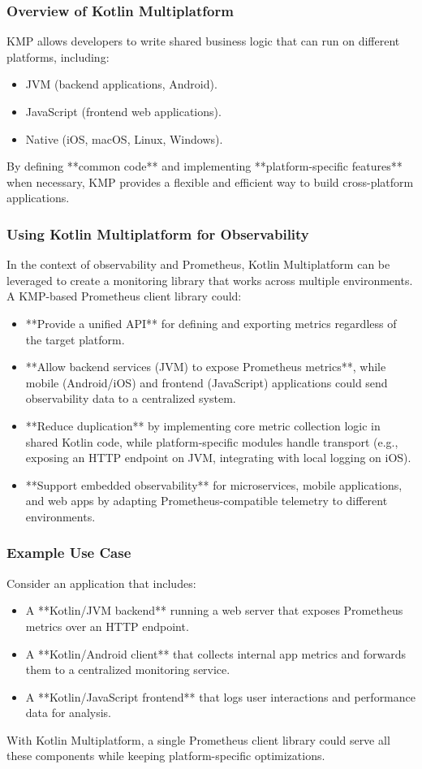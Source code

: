 \documentclass[a4paper,twoside,11pt]{article}
\begin{document}
\subsubsection{Overview of Kotlin Multiplatform}
KMP allows developers to write shared business logic that can run on different platforms, including:
\begin{itemize}
    \item JVM (backend applications, Android).
    \item JavaScript (frontend web applications).
    \item Native (iOS, macOS, Linux, Windows).
\end{itemize}
By defining **common code** and implementing **platform-specific features** when necessary, KMP provides a flexible and efficient way to build cross-platform applications.

\subsubsection{Using Kotlin Multiplatform for Observability}
In the context of observability and Prometheus, Kotlin Multiplatform can be leveraged to create a monitoring library that works across multiple environments. A KMP-based Prometheus client library could:
\begin{itemize}
    \item **Provide a unified API** for defining and exporting metrics regardless of the target platform.
    \item **Allow backend services (JVM) to expose Prometheus metrics**, while mobile (Android/iOS) and frontend (JavaScript) applications could send observability data to a centralized system.
    \item **Reduce duplication** by implementing core metric collection logic in shared Kotlin code, while platform-specific modules handle transport (e.g., exposing an HTTP endpoint on JVM, integrating with local logging on iOS).
    \item **Support embedded observability** for microservices, mobile applications, and web apps by adapting Prometheus-compatible telemetry to different environments.
\end{itemize}

\subsubsection{Example Use Case}
Consider an application that includes:
\begin{itemize}
    \item A **Kotlin/JVM backend** running a web server that exposes Prometheus metrics over an HTTP endpoint.
    \item A **Kotlin/Android client** that collects internal app metrics and forwards them to a centralized monitoring service.
    \item A **Kotlin/JavaScript frontend** that logs user interactions and performance data for analysis.
\end{itemize}
With Kotlin Multiplatform, a single Prometheus client library could serve all these components while keeping platform-specific optimizations.
\end{document}
